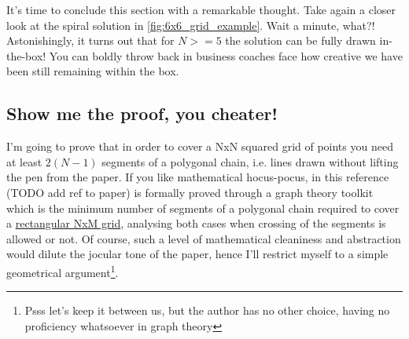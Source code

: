\documentclass[11pt]{article}
\begin{document}
It's time to conclude this section with a remarkable thought. Take again a closer look at the spiral solution in \autoref{fig:6x6_grid_example}. Wait a minute, what?! Astonishingly, it turns out that for $N >= 5$ the solution can be fully drawn in-the-box!
You can boldly throw back in business coaches face how creative we have been still remaining within the box.


\hypertarget{proof-extended-solution} {
	\subsection{Show me the proof, you cheater!}
	\label{proof-extended-solution}
}

I'm going to prove that in order to cover a NxN squared grid of points you need at least $2(N - 1)$ segments of a polygonal chain, i.e. lines drawn without lifting the pen from the paper. If you like mathematical hocus-pocus, in this reference (TODO add ref to paper) is formally proved through a graph theory toolkit which is the minimum number of segments of a polygonal chain required to cover a \underline{rectangular NxM grid}, analysing both cases when crossing of the segments is allowed or not. Of course, such a level of mathematical cleaniness and abstraction would dilute the jocular tone of the paper, hence I'll restrict myself to a simple geometrical argument\footnote{Psss let's keep it between us, but the author has no other choice, having no proficiency whatsoever in graph theory}.
\end{document}

